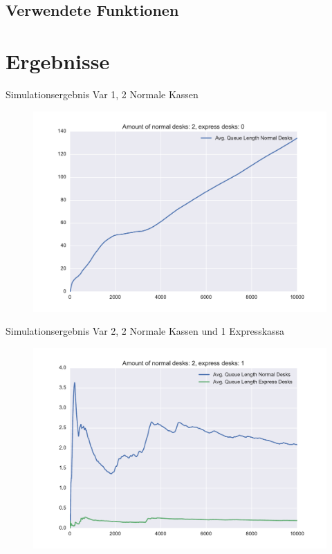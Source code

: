 \subsection{Verwendete Funktionen}
%

\section{Ergebnisse}
\begin{frame}[fragile]{Simulationsergebnis Var 1, 2 Normale Kassen}
    	\begin{figure}[h!]
    	\includegraphics[scale=0.5]{BSP30_Plot_1.pdf}
		\end{figure}
\end{frame}

\begin{frame}[fragile]{Simulationsergebnis Var 2, 2 Normale Kassen und 1 Expresskassa}
    	\begin{figure}[h!]
    	\includegraphics[scale=0.5]{BSP30_Plot_2.pdf}
		\end{figure}
\end{frame}

